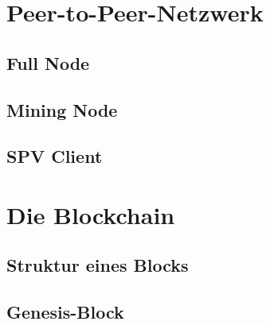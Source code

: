 \section{Peer-to-Peer-Netzwerk}
\subsection{Full Node}
\subsection{Mining Node}
\subsection{SPV Client}

\section{Die Blockchain}
\subsection{Struktur eines Blocks}
\subsection{Genesis-Block}
